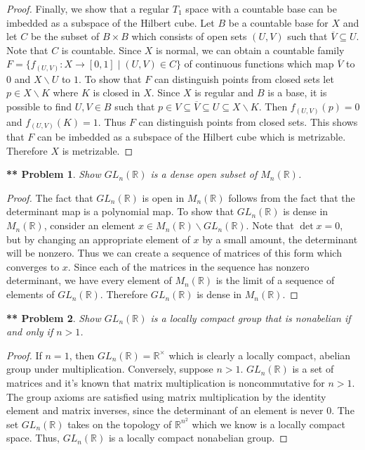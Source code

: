 \documentclass{article}
\newtheorem{**}{** Problem}
\begin{document}
\begin{flushleft}
\begin{proof}
Finally, we show that a regular $T_1$ space with a countable base can be imbedded as a subspace of the Hilbert cube. Let $B$ be a countable base for $X$ and let $C$ be the subset of $B \times B$ which consists of open sets $(U, V)$ such that $\overline{V} \subseteq U$. Note that $C$ is countable. Since $X$ is normal, we can obtain a countable family $F = \{f_{(U,V)} : X \rightarrow [0,1] \mid (U,V) \in C\}$ of continuous functions which map $\overline{V}$ to $0$ and $X \backslash U$ to $1$. To show that $F$ can distinguish points from closed sets let $p \in X \backslash K$ where $K$ is closed in $X$. Since $X$ is regular and $B$ is a base, it is possible to find $U,V \in B$ such that $p \in V \subseteq \overline{V} \subseteq U \subseteq X \backslash K$. Then $f_{(U,V)}(p) = 0$ and $f_{(U,V)}(K) = 1$. Thus $F$ can distinguish points from closed sets. This shows that $F$ can be imbedded as a subspace of the Hilbert cube which is metrizable. Therefore $X$ is metrizable.
\end{proof}

\begin{**}
Show $GL_n (\mathbb{R})$ is a dense open subset of $M_n(\mathbb{R})$.
\end{**}
\begin{proof}
The fact that $GL_n (\mathbb{R})$ is open in $M_n (\mathbb{R})$ follows from the fact that the determinant map is a polynomial map. To show that $GL_n (\mathbb{R})$ is dense in $M_n (\mathbb{R})$, consider an element $x \in M_n (\mathbb{R}) \backslash GL_n (\mathbb{R})$. Note that $\det x = 0$, but by changing an appropriate element of $x$ by a small amount, the determinant will be nonzero. Thus we can create a sequence of matrices of this form which converges to $x$. Since each of the matrices in the sequence has nonzero determinant, we have every element of $M_n (\mathbb{R})$ is the limit of a sequence of elements of $GL_n (\mathbb{R})$. Therefore $GL_n (\mathbb{R})$ is dense in $M_n (\mathbb{R})$.
\end{proof}

\begin{**}
Show $GL_n (\mathbb{R})$ is a locally compact group that is nonabelian if and only if $n > 1$.
\end{**}
\begin{proof}
If $n=1$, then $GL_n(\mathbb{R}) = \mathbb{R}^{\times}$ which is clearly a locally compact, abelian group under multiplication. Conversely, suppose $n > 1$. $GL_n(\mathbb{R})$ is a set of matrices and it's known that matrix multiplication is noncommutative for $n>1$. The group axioms are satisfied using matrix multiplication by the identity element and matrix inverses, since the determinant of an element is never $0$. The set $GL_n (\mathbb{R})$ takes on the topology of $\mathbb{R}^{n^2}$ which we know is a locally compact space. Thus, $GL_n(\mathbb{R})$ is a locally compact nonabelian group.
\end{proof}


\end{flushleft}
\end{document}
